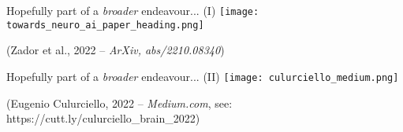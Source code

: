 {    \begin{frame}{ Hopefully part of a \textit{broader} endeavour... (I)}
        \centering
        \vspace*{10px}
        \texttt{[image: towards\_neuro\_ai\_paper\_heading.png]}
        \vspace*{10px}

        (Zador et al., 2022 -- \textit{ArXiv, abs/2210.08340})
        \vspace*{10px}
    \end{frame}

    \begin{frame}{ Hopefully part of a \textit{broader} endeavour... (II)}
    \centering
    \vspace*{10px}
    \texttt{[image: culurciello\_medium.png]}
    \vspace*{10px}

    (Eugenio Culurciello, 2022 -- \textit{Medium.com}, see: {https://cutt.ly/culurciello\_brain\_2022})
    \vspace*{10px}
\end{frame}
}
